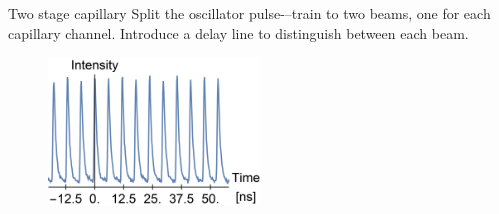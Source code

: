 \documentclass[dvipsnames]{beamer}
\begin{document}
\begin{frame}{Two stage capillary}
Split the oscillator pulse-–train to two beams, one for each capillary
channel.
Introduce a delay line to distinguish between each beam.
\begin{figure}
    \includegraphics[width=0.5\textwidth]{figures/results/2stageCapillary/double.png}
\end{figure}
\end{frame}
\end{document}
